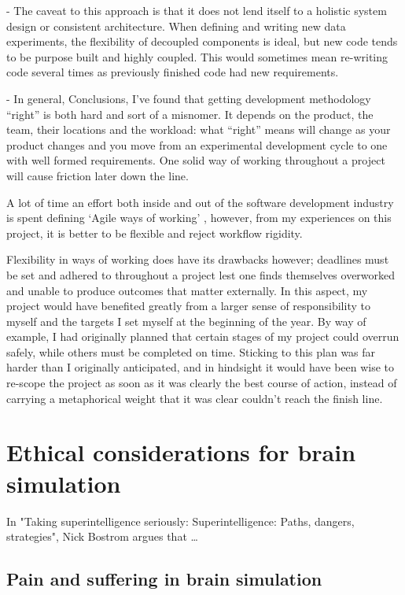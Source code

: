 - The caveat to this approach is that it does not lend itself to a holistic
system design or consistent architecture. When defining and writing new
data experiments, the flexibility of decoupled components is ideal, but new code
tends to be purpose built and highly coupled. This would sometimes mean
re-writing code several times as previously finished code had new requirements.

- In general, Conclusions, I’ve found that getting development methodology
“right” is both hard and sort of a misnomer. It depends on the product, the
team, their locations and the workload: what “right” means will change as your
product changes and you move from an experimental development cycle to one with
well formed requirements. One solid way of working throughout a project will
cause friction later down the line.

A lot of time an effort both inside and out of the software development industry
is spent defining `Agile ways of working' \autocite{spolsky_you_2006}, however, from my experiences on this
project, it is better to be flexible and reject workflow rigidity.

Flexibility in ways of working does have its drawbacks however; deadlines must
be set and adhered to throughout a project lest one finds themselves overworked
and unable to produce outcomes that matter externally. In this aspect, my
project would have benefited greatly from a larger sense of responsibility to
myself and the targets I set myself at the beginning of the year. By way of
example, I had originally planned that certain stages of my project could
overrun safely, while others must be completed on time. Sticking to this plan
was far harder than I originally anticipated, and in hindsight it would have been
wise to re-scope the project as soon as it was clearly the best course of action,
instead of carrying a metaphorical weight that it was clear couldn't reach the
finish line.


\section{Ethical considerations for brain simulation}


In "Taking superintelligence seriously: Superintelligence: Paths, dangers,
strategies", Nick Bostrom argues that \ldots
\autocite{bostrom_superintelligence_2014}

\subsection{Pain and suffering in brain simulation}

